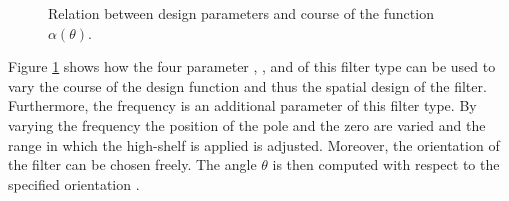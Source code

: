 \begin{figure}[H]
 \caption{Relation between design parameters and course of the function $\alpha(\theta)$.}
 \label{Fig_alpha}
\end{figure}

Figure \ref{Fig_alpha} shows how the four parameter , ,
 and  of this filter type can be used to vary the course of
the design function and thus the spatial design of the filter.
Furthermore, the frequency  is an additional parameter of this filter
type. By varying the frequency  the position of the pole and the zero are
varied and the range in which the high-shelf is applied is adjusted.
Moreover, the orientation  of the filter can be chosen freely. The angle
$\theta$ is then computed with respect to the specified orientation .

